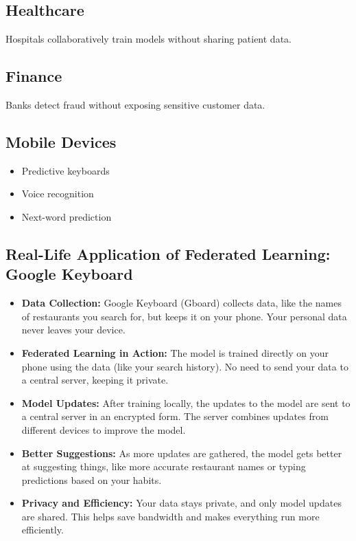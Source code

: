 \documentclass[12pt]{article}
\begin{document}
\subsection{Healthcare}
Hospitals collaboratively train models without sharing patient data.

\subsection{Finance}
Banks detect fraud without exposing sensitive customer data.

\subsection{Mobile Devices}
\begin{itemize}
    \item Predictive keyboards
    \item Voice recognition
    \item Next-word prediction
\end{itemize}

\subsection{Real-Life Application of Federated Learning: Google Keyboard}
\begin{itemize}
    \item \textbf{Data Collection:} Google Keyboard (Gboard) collects data, like the names of restaurants you search for, but keeps it on your phone. Your personal data never leaves your device.
    \item \textbf{Federated Learning in Action:} The model is trained directly on your phone using the data (like your search history). No need to send your data to a central server, keeping it private.
    \item \textbf{Model Updates:} After training locally, the updates to the model are sent to a central server in an encrypted form. The server combines updates from different devices to improve the model.
    \item \textbf{Better Suggestions:} As more updates are gathered, the model gets better at suggesting things, like more accurate restaurant names or typing predictions based on your habits.
    \item \textbf{Privacy and Efficiency:} Your data stays private, and only model updates are shared. This helps save bandwidth and makes everything run more efficiently.
\end{itemize}
\end{document}
